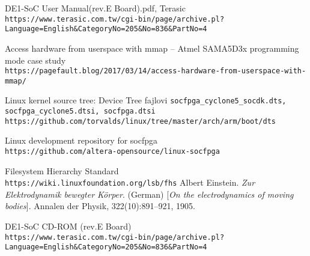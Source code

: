 \begin{thebibliography}{9}
DE1-SoC User Manual(rev.E Board).pdf, Terasic\\ \verb+https://www.terasic.com.tw/cgi-bin/page/archive.pl?Language=English&CategoryNo=205&No=836&PartNo=4 +
 
Access hardware from userspace with mmap – Atmel SAMA5D3x programming mode case study\\ \verb+https://pagefault.blog/2017/03/14/access-hardware-from-userspace-with-mmap/+
 
Linux kernel source tree: Device Tree fajlovi \texttt{socfpga\_cyclone5\_socdk.dts, socfpga\_cyclone5.dtsi, socfpga.dtsi}\\
\verb+https://github.com/torvalds/linux/tree/master/arch/arm/boot/dts+

Linux development repository for socfpga\\ \verb+https://github.com/altera-opensource/linux-socfpga+

Filesystem Hierarchy Standard \\ \verb+https://wiki.linuxfoundation.org/lsb/fhs+
Albert Einstein. 
\textit{Zur Elektrodynamik bewegter K{\"o}rper}. (German) 
[\textit{On the electrodynamics of moving bodies}]. 
Annalen der Physik, 322(10):891–921, 1905.

DE1-SoC CD-ROM (rev.E Board)\\
\verb+https://www.terasic.com.tw/cgi-bin/page/archive.pl?Language=English&CategoryNo=205&No=836&PartNo=4+
\end{thebibliography}